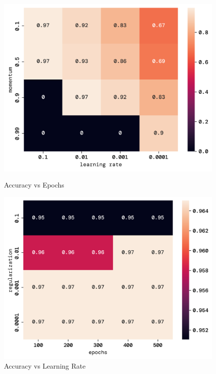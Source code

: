 \documentclass[twoside,11pt]{report}
\begin{document}
\begin{figure}[!h]
\begin{minipage}{0.5\textwidth}
    \begin{center}
        \includegraphics[width=\textwidth]{../runsAndFigures/chge.png}
        \caption{Accuracy vs Epochs}\label{fig:}
    \end{center}
\end{minipage}
\begin{minipage}{0.5\textwidth}
    \begin{center}
        \includegraphics[width=\textwidth]{../runsAndFigures/chle.png}
        \caption{Accuracy vs Learning Rate}\label{fig:}
    \end{center}
\end{minipage}
\end{figure}
\end{document}
